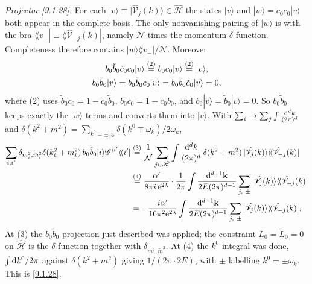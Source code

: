 \begin{tcolorbox}[breakable]
\begin{remark}
		\emph{Projector \eqref{9.1.28}.} For each $|v\rangle\equiv|\hat{\mathscr V}_j(k)\rangle\in\hat{\mathscr H}$ the states $|v\rangle$ and $|w\rangle=\tilde c_0c_0|v\rangle$ both appear in the complete basis. The only nonvanishing pairing of $|w\rangle$ is with the bra $\lAngle v_-|\equiv\lAngle\hat{\mathscr V}_{-j}(k)|$, namely $\mathcal N$ times the momentum $\delta$-function. Completeness therefore contains $|w\rangle\lAngle v_-|/\mathcal N$. Moreover
		\begin{gather*}
			b_0\tilde b_0\tilde c_0c_0|v\rangle\overset{(2)}{=} b_0c_0|v\rangle\overset{(2)}{=}|v\rangle ,\\
			b_0\tilde b_0|v\rangle=b_0\tilde b_0c_0|v\rangle=b_0\tilde b_0\tilde c_0|v\rangle=0 ,
		\end{gather*}
		where (2) uses $\tilde b_0\tilde c_0=1-\tilde c_0\tilde b_0$, $b_0c_0=1-c_0b_0$, and $b_0|v\rangle=\tilde b_0|v\rangle=0$. So $b_0\tilde b_0$ keeps exactly the $|w\rangle$ terms and converts them into $|v\rangle$. With $\sum_i\to\sum_j\int\frac{\mathrm{d}^dk}{(2\pi)^d}$ and $\delta(k^2+m^2)=\sum_{k^0=\pm\omega_k}\delta(k^0\mp\omega_k)/2\omega_k$,
		\begin{align*}
			\sum_{i,i'}\delta_{m_i^2,\tilde m_i^2}\delta(k_i^2+m_i^2)\,b_0\tilde b_0|i\rangle\mathscr G^{ii'}\langle\!\langle i'|
			&\overset{(3)}{=} \frac{1}{\mathcal N}\sum_{j\in\hat{\mathscr H}}\int\frac{\mathrm{d}^dk}{(2\pi)^d}\,\delta(k^2+m^2)\,|\hat{\mathscr V}_j(k)\rangle\langle\!\langle\hat{\mathscr V}_{-j}(k)|\\
			&\overset{(4)}{=} \frac{\alpha'}{8\pi i\,\mathrm{e}^{2\lambda}}\cdot\frac{1}{2\pi}\int\frac{\mathrm{d}^{d-1}\mathbf k}{2E(2\pi)^{d-1}}\sum_{j,\ \pm}|\hat{\mathscr V}_j(k)\rangle\langle\!\langle\hat{\mathscr V}_{-j}(k)|\\
			&= -\frac{i\alpha'}{16\pi^2\mathrm{e}^{2\lambda}}\int\frac{\mathrm{d}^{d-1}\mathbf k}{2E(2\pi)^{d-1}}\sum_{j,\ \pm}|\hat{\mathscr V}_j(k)\rangle\langle\!\langle\hat{\mathscr V}_{-j}(k)| ,
		\end{align*}
		At (3) the $b_0\tilde b_0$ projection just described was applied; the constraint $L_0=\tilde L_0=0$ on $\hat{\mathscr H}$ is the $\delta$-function together with $\delta_{m^2,\tilde m^2}$. At (4) the $k^0$ integral was done, $\int\mathrm{d} k^0/2\pi$ against $\delta(k^2+m^2)$ giving $1/(2\pi\cdot2E)$, with $\pm$ labelling $k^0=\pm\omega_k$. This is \eqref{9.1.28}.


\end{remark}
\end{tcolorbox}
